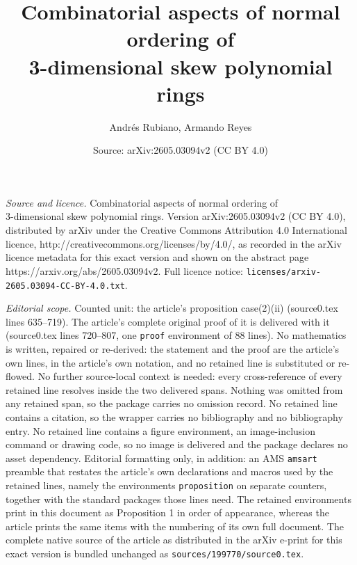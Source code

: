 \documentclass[10pt,a4paper]{amsart}
\title{Combinatorial aspects of normal ordering of \\ 3-dimensional skew polynomial rings}
\author{Andr\'es Rubiano, Armando Reyes}
\date{Source: arXiv:2605.03094v2 (CC BY 4.0)}
\begin{document}
\maketitle

\noindent\emph{Source and licence.} Combinatorial aspects of normal ordering of \\ 3-dimensional skew polynomial rings. Version arXiv:2605.03094v2 (CC BY 4.0), distributed by arXiv under the Creative Commons Attribution 4.0 International licence, http://creativecommons.org/licenses/by/4.0/, as recorded in the arXiv licence metadata for this exact version and shown on the abstract page https://arxiv.org/abs/2605.03094v2. Full licence notice: \texttt{licenses/arxiv-2605.03094-CC-BY-4.0.txt}.\par\smallskip

\noindent\textit{Editorial scope.} Counted unit: the article's proposition case(2)(ii) (source0.tex lines 635--719). The article's complete original proof of it is delivered with it (source0.tex lines 720--807, one \texttt{proof} environment of 88 lines). No mathematics is written, repaired or re-derived: the statement and the proof are the article's own lines, in the article's own notation, and no retained line is substituted or re-flowed.  No further source-local context is needed: every cross-reference of every retained line resolves inside the two delivered spans.  Nothing was omitted from any retained span, so the package carries no omission record.  No retained line contains a citation, so the wrapper carries no bibliography and no bibliography entry.  No retained line contains a figure environment, an image-inclusion command or drawing code, so no image is delivered and the package declares no asset dependency.  Editorial formatting only, in addition: an AMS \texttt{amsart} preamble that restates the article's own declarations and macros used by the retained lines, namely the environments \texttt{proposition} on separate counters, together with the standard packages those lines need.  The retained environments print in this document as Proposition 1 in order of appearance, whereas the article prints the same items with the numbering of its own full document.  The complete native source of the article as distributed in the arXiv e-print for this exact version is bundled unchanged as \texttt{sources/199770/source0.tex}.
\end{document}
